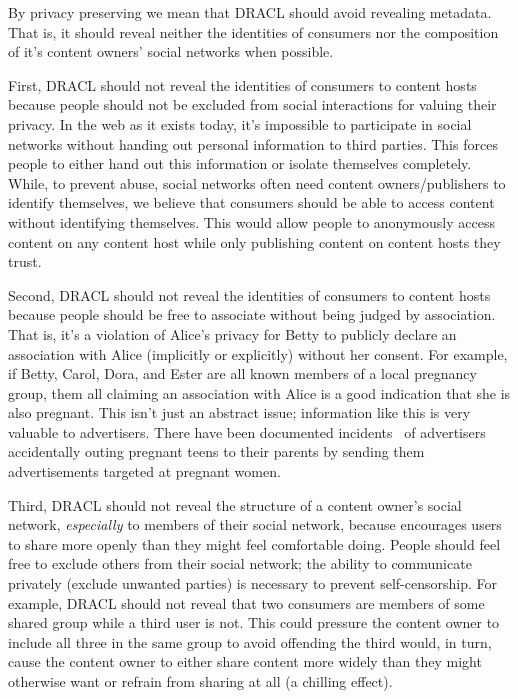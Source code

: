 \documentclass[pdftex,12pt,a4papaer]{report}
\begin{document}
By privacy preserving we mean that DRACL should avoid revealing metadata. That
is, it should reveal neither the identities of consumers nor the composition of
it's content owners' social networks when possible.

First, DRACL should not reveal the identities of consumers to content hosts
because people should not be excluded from social interactions for valuing their
privacy. In the web as it exists today, it's impossible to participate in social
networks without handing out personal information to third parties. This forces
people to either hand out this information or isolate themselves completely.
While, to prevent abuse, social networks often need content owners/publishers to
identify themselves, we believe that consumers should be able to access content
without identifying themselves. This would allow people to anonymously access
content on any content host while only publishing content on content hosts they
trust.

Second, DRACL should not reveal the identities of consumers to content hosts
because people should be free to associate without being judged by association.
That is, it's a violation of Alice's privacy for Betty to publicly declare an
association with Alice (implicitly or explicitly) without her consent. For
example, if Betty, Carol, Dora, and Ester are all known members of a local
pregnancy group, them all claiming an association with Alice is a good
indication that she is also pregnant. This isn't just an abstract issue;
information like this is very valuable to advertisers. There have been
documented incidents~\cite{target} of advertisers accidentally outing pregnant
teens to their parents by sending them advertisements targeted at pregnant
women.

Third, DRACL should not reveal the structure of a content owner's social network,
\emph{especially} to members of their social network, because encourages users
to share more openly than they might feel comfortable doing. People should feel free to exclude others from their
social network; the ability to communicate privately (exclude unwanted parties)
is necessary to prevent self-censorship. For example, DRACL should not reveal
that two consumers are members of some shared group while a third user is not.
This could pressure the content owner to include all three in the same group to
avoid offending the third would, in turn, cause the content owner to either
share content more widely than they might otherwise want or refrain from sharing
at all (a chilling effect).
\end{document}
